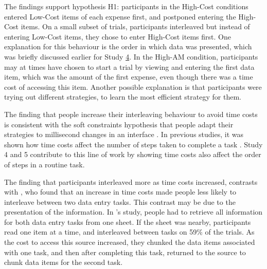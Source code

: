 The findings support hypothesis H1: participants in the High-Cost conditions entered Low-Cost items of each expense first, and postponed entering the High-Cost items. On a small subset of trials, participants interleaved but instead of entering Low-Cost items, they chose to enter High-Cost items first. One explanation for this behaviour is the order in which data was presented, which was briefly discussed earlier for Study \hyperref[st:Study4]{4}. In the High-AM condition, participants may at times have chosen to start a trial by viewing and entering the first data item, which was the amount of the first expense, even though there was a time cost of accessing this item. Another possible explanation is that participants were trying out different strategies, to learn the most efficient strategy for them. 


The finding that people increase their interleaving behaviour to avoid time costs is consistent with the soft constraints hypothesis that people adapt their strategies to millisecond changes in an interface \citep{Charman2003, Gray2004}. In previous studies, it was shown how time costs affect the number of steps taken to complete a task \citep{Gray2006}. Study 4 and 5 contribute to this line of work by showing time costs also affect the order of steps in a routine task.

The finding that participants interleaved more as time costs increased, contrasts with \citet{Back2012}, who found that an increase in time costs made people less likely to interleave between two data entry tasks. This contrast may be due to the presentation of the information. In \citet{Back2012}'s study, people had to retrieve all information for both data entry tasks from one sheet. If the sheet was nearby, participants read one item at a time, and interleaved between tasks on 59\% of the trials.  As the cost to access this source increased, they chunked the data items associated with one task, and then after completing this task, returned to the source to chunk data items for the second task. 


